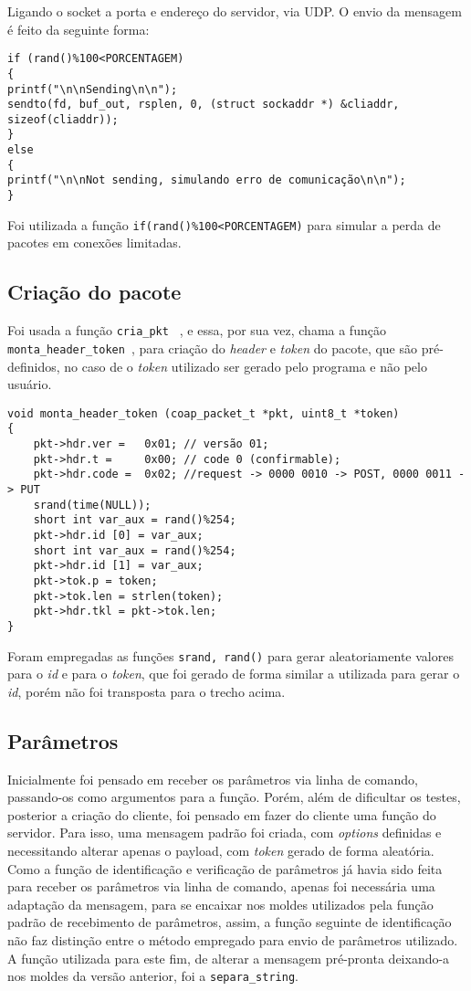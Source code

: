 Ligando o socket a porta e endereço do servidor, via UDP.
O envio da mensagem é feito da seguinte forma:

\begin{lstlisting}
if (rand()%100<PORCENTAGEM)
{
printf("\n\nSending\n\n");
sendto(fd, buf_out, rsplen, 0, (struct sockaddr *) &cliaddr, sizeof(cliaddr));
}
else
{
printf("\n\nNot sending, simulando erro de comunicação\n\n");
}    
\end{lstlisting}

Foi utilizada a função \texttt{if(rand()\%100<PORCENTAGEM)} para simular a perda de pacotes em conexões limitadas.


\subsection{Criação do pacote}

Foi usada a função \texttt{cria\_pkt } , e essa, por sua vez, chama a função \texttt{monta\_header\_token }, para criação do \textit{header} e \textit{token} do pacote, que são pré-definidos, no caso de o \textit{token} utilizado ser gerado pelo programa e não pelo usuário. 

\begin{lstlisting}
void monta_header_token (coap_packet_t *pkt, uint8_t *token)
{
	pkt->hdr.ver = 	 0x01; // versão 01;
	pkt->hdr.t = 	 0x00; // code 0 (confirmable);
	pkt->hdr.code =  0x02; //request -> 0000 0010 -> POST, 0000 0011 -> PUT
	srand(time(NULL));
	short int var_aux = rand()%254;
	pkt->hdr.id [0] = var_aux;
	short int var_aux = rand()%254;
	pkt->hdr.id [1] = var_aux;
	pkt->tok.p = token;
	pkt->tok.len = strlen(token);
	pkt->hdr.tkl = pkt->tok.len;
}
\end{lstlisting}

Foram empregadas as funções \texttt{srand, rand()} para gerar aleatoriamente valores para o \textit{id} e para o \textit{token}, que foi gerado de forma similar a utilizada para gerar o \textit{id}, porém não foi transposta para o trecho acima. 

\subsection{Parâmetros}

Inicialmente foi pensado em receber os parâmetros via linha de comando, passando-os como argumentos para a função.
Porém, além de dificultar os testes, posterior a criação do cliente, foi pensado em fazer do cliente uma função do servidor. Para isso, uma mensagem padrão foi criada, com \textit{options} definidas e necessitando alterar apenas o payload, com \textit{token} gerado de forma aleatória.
Como a função de identificação e verificação de parâmetros já havia sido feita para receber os parâmetros via linha de comando, apenas foi necessária uma adaptação da mensagem, para se encaixar nos moldes utilizados pela função padrão de recebimento de parâmetros, assim, a função seguinte de identificação não faz distinção entre o método empregado para envio de parâmetros utilizado.
A função utilizada para este fim, de alterar a mensagem pré-pronta deixando-a nos moldes da versão anterior, foi a \texttt{separa_string}.


